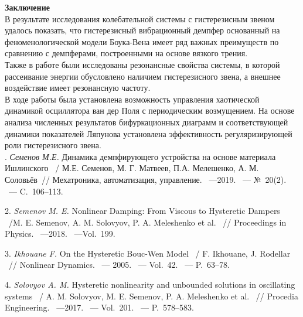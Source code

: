 \textbf{Заключение}\\
В результате исследования колебательной системы с гистерезисным звеном удалось показать, что гистерезисный вибрационный демпфер основанный на феноменологической модели Боука-Вена имеет ряд важных преимуществ по сравнению с демпферами, построенными на основе вязкого трения.\\
Также в работе были исследованы резонансные свойства системы, в которой рассеивание энергии обусловлено наличием гистерезисного звена, а внешнее воздействие имеет резонансную частоту.\\
В ходе работы была установлена возможность управления хаотической динамикой осциллятора ван дер Поля с периодическим возмущением. На основе анализа численных результатов бифуркационных диаграмм и соответствующей динамики показателей Ляпунова установлена эффективность регуляризирующей роли гистерезисного звена.\\


. {\it Семенов М.Е.} Динамика демпфирующего устройства на основе материала Ишлинского ~/ М.Е. Семенов, М. Г. Матвеев, П.А. Мелешенко, А. М. Соловьёв~// Мехатроника, автоматизация, управление. ~---2019. ~--- №~20(2). ~--- C.~106--113.

2. {\it Semenov M. E.} Nonlinear Damping: From Viscous to Hysteretic Dampers ~/M. E. Semenov, A. M. Solovyov, P. A. Meleshenko et al. ~// Proceedings in Physics. ~---2018. ~---Vol.~199.

3. {\it Ikhouane F.} On the Hysteretic Bouc-Wen Model ~/ F. Ikhouane, J. Rodellar ~// Nonlinear Dynamics. ~--- 2005. ~--- Vol.~42. ~--- P.~63--78.

4. {\it Solovyov A. M.} Hysteretic nonlinearity and unbounded solutions in oscillating systems ~/ A. M. Solovyov, M. E. Semenov, P. A. Meleshenko et al. ~// Procedia Engineering. ~---2017. ~--- Vol.~201. ~--- P.~578--583.
